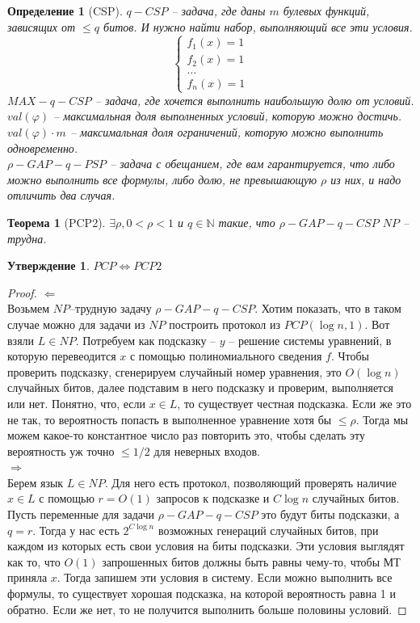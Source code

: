\documentclass[12pt, letterpaper]{article}
\newtheorem{theorem}{Теорема}[section]
\newtheorem{prop}{Утверждение}[section]
\newtheorem{defi}{Определение}[section]
\newcommand{\N}{\mathbb{N}}
\newcommand{\ph}{\varphi}
\begin{document}
\begin{defi}[CSP]
$q-CSP$ -- задача, где даны $m$ булевых функций, зависящих от $\leq q$ битов. И нужно найти набор, выполняющий все эти условия.
$$\begin{cases}
f_1(x)=1 \\
f_2(x)=1 \\
\ldots \\
f_n(x) = 1
\end{cases}$$
$MAX-q-CSP$ -- задача, где хочется выполнить наибольшую долю от условий. $val(\ph)$ -- максимальная доля выполненных условий, которую можно достичь. $val(\ph) \cdot m$ -- максимальная доля ограничений, которую можно выполнить одновременно.\\
$\rho-GAP-q-PSP$ -- задача с обещанием, где вам гарантируется, что либо можно выполнить все формулы, либо долю, не превышающую $\rho$ из них, и надо отличить два случая.
\end{defi}

\begin{theorem}[PCP2]
$\exists \rho, 0 < \rho < 1$ и $q \in \N$ такие, что $\rho-GAP-q-CSP$ $NP$ -- трудна.
\end{theorem}

\begin{prop}
$PCP \Longleftrightarrow PCP2$
\end{prop}
\begin{proof}
$ \Longleftarrow $\\
Возьмем $NP$--трудную задачу $\rho-GAP-q-CSP$. Хотим показать, что в таком случае можно для задачи из $NP$ построить протокол из $PCP(\log n, 1)$. Вот взяли $L \in NP$. Потребуем как подсказку -- $y$ -- решение системы уравнений, в которую перевеодится $x$ с помощью полиномиального сведения $f$. Чтобы проверить подсказку, сгенерируем случайный номер уравнения, это $O(\log n)$ случайных битов, далее подставим в него подсказку и проверим, выполняется или нет. Понятно, что, если $x \in L$, то существует честная подсказка. Если же это не так, то вероятность попасть в выполненное уравнение хотя бы $\leq \rho$. Тогда мы можем какое-то константное число раз повторить это, чтобы сделать эту вероятность уж точно $\leq 1/2$ для неверных входов.\\
$\Longrightarrow$ \\
Берем язык $L \in NP$. Для него есть протокол, позволяющий проверять наличие $x \in L$ с помощью $r = O(1)$ запросов к подсказке и $C \log n$ случайных битов. Пусть переменные для задачи $\rho-GAP-q-CSP$ это будут биты подсказки, а $q = r$. Тогда у нас есть $2^{C \log n}$ возможных генераций случайных битов, при каждом из которых есть свои условия на биты        подсказки. Эти условия выглядят как то, что $O(1)$  запрошенных битов должны быть равны чему-то, чтобы МТ приняла $x$. Тогда запишем эти условия в систему. Если можно выполнить все формулы, то существует хорошая подсказка, на которой вероятность равна 1 и обратно. Если же нет, то не получится выполнить больше половины условий.     

\end{proof}
\end{document}

